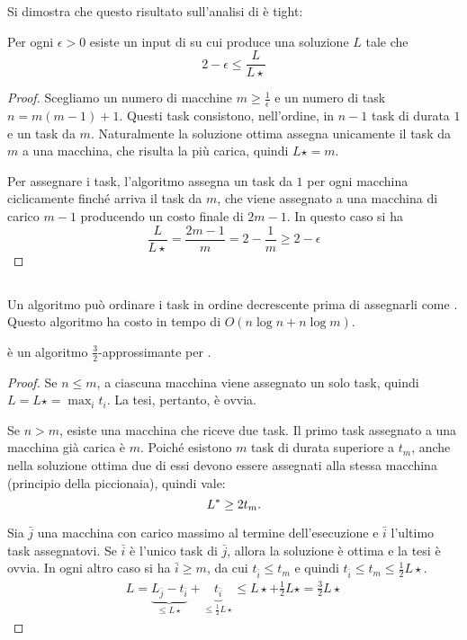 Si dimostra che questo risultato sull'analisi di \GreedyLoadBalancing è tight:
\begin{theorem}
	Per ogni $\epsilon>0$ esiste un input di \LoadBalancing su cui \GreedyLoadBalancing produce una soluzione $L$ tale che
	\begin{equation*}
		2-\epsilon\leq\frac L{L\star}
	\end{equation*}
\end{theorem}
\begin{proof}
	Scegliamo un numero di macchine $m\geq\frac1\epsilon$ e un numero di task $n=m(m-1)+1$. Questi task consistono, nell'ordine, in $n-1$ task di durata $1$ e un task da $m$. Naturalmente la soluzione ottima assegna unicamente il task da $m$ a una macchina, che risulta la più carica, quindi $L\star=m$.

	Per assegnare i task, l'algoritmo assegna un task da $1$ per ogni macchina ciclicamente finché arriva il task da $m$, che viene assegnato a una macchina di carico $m-1$ producendo un costo finale di $2m-1$. In questo caso si ha
	\begin{equation*}
		\frac L{L\star}=\frac{2m-1}{m}=2-\frac1m\geq2-\epsilon
	\end{equation*}
\end{proof}


\subsection{\SortedGreedyBalance}
Un algoritmo \SortedGreedyBalance può ordinare i task in ordine decrescente prima di assegnarli come \GreedyLoadBalancing. Questo algoritmo ha costo in tempo di $O(n\log n+n\log m)$.

\begin{theorem}
	\SortedGreedyBalance è un algoritmo $\frac32$-approssimante per \LoadBalancing.
\end{theorem}
\begin{proof}
	Se $n\leq m$, a ciascuna macchina viene assegnato un solo task, quindi $L=L\star=\max_i t_i$. La tesi, pertanto, è ovvia.

	Se $n>m$, esiste una macchina che riceve due task.
	Il primo task assegnato a una macchina già carica è $m$.
	Poiché esistono $m$ task di durata superiore a $t_m$, anche nella soluzione ottima due di essi devono essere assegnati alla stessa macchina (principio della piccionaia), quindi vale:
	\begin{equation*}
		L\star\geq 2t_m \text.
	\end{equation*}

	Sia $\bar j$ una macchina con carico massimo al termine dell'esecuzione e $\bar i$ l'ultimo task assegnatovi.
	Se $\bar i$ è l'unico task di $\bar j$, allora la soluzione è ottima e la tesi è ovvia.
	In ogni altro caso si ha $\bar i \geq m$, da cui $t_{\bar i}\leq t_m$ e quindi $t_{\bar i}\leq t_m\leq \frac12 L\star$.
	\begin{gather*}
		L=\underbrace{L_{\bar j}-t_{\bar i}}_{\leq L\star}+\underbrace{t_{\bar i}}_{\leq \frac12 L\star}\leq L\star+\frac12 L\star=\frac32L\star
	\end{gather*}
\end{proof}

